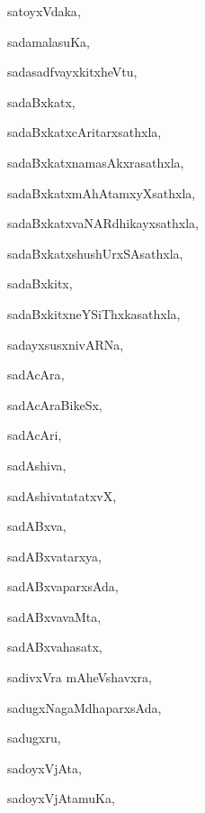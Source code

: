 \begin{multicols}{3}
{\noindent
{satoyxVdaka}, \pageref{satoyxVdaka}

\noindent
{sadamalasuKa}, \pageref{sadamalasuKa}

\noindent
{sadasadfvayxkitxheVtu}, \pageref{sadasadfvayxkitxheVtu}

\noindent
{sadaBxkatx}, \pageref{sadaBxkatx}

\noindent
{sadaBxkatxcAritarxsathxla}, \pageref{sadaBxkatxcAritarxsathxla}

\noindent
{sadaBxkatxnamasAkxrasathxla}, \pageref{sadaBxkatxnamasAkxrasathxla}

\noindent
{sadaBxkatxmAhAtamxyXsathxla}, \pageref{sadaBxkatxmAhAtamxyXsathxla}

\noindent
{sadaBxkatxvaNARdhikayxsathxla}, \pageref{sadaBxkatxvaNARdhikayxsathxla}

\noindent
{sadaBxkatxshushUrxSAsathxla}, \pageref{sadaBxkatxshushUrxSAsathxla}

\noindent
{sadaBxkitx}, \pageref{sadaBxkitx}

\noindent
{sadaBxkitxneYSiThxkasathxla}, \pageref{sadaBxkitxneYSiThxkasathxla}

\noindent
{sadayxsusxnivARNa}, \pageref{sadayxsusxnivARNa}

\noindent
{sadAcAra}, \pageref{sadAcAra}

\noindent
{sadAcAraBikeSx}, \pageref{sadAcAraBikeSx}

\noindent
{sadAcAri}, \pageref{sadAcAri}

\noindent
{sadAshiva}, \pageref{sadAshiva}

\noindent
{sadAshivatatatxvX}, \pageref{sadAshivatatatxvX}

\noindent
{sadABxva}, \pageref{sadABxva}

\noindent
{sadABxvatarxya}, \pageref{sadABxvatarxya}

\noindent
{sadABxvaparxsAda}, \pageref{sadABxvaparxsAda}

\noindent
{sadABxvavaMta}, \pageref{sadABxvavaMta}

\noindent
{sadABxvahasatx}, \pageref{sadABxvahasatx}

\noindent
{sadivxVra mAheVshavxra}, \pageref{sadivxVramAheVshavxra}

\noindent
{sadugxNagaMdhaparxsAda}, \pageref{sadugxNagaMdhaparxsAda}

\noindent
{sadugxru}, \pageref{sadugxru}

\noindent
{sadoyxVjAta}, \pageref{sadoyxVjAta}

\noindent
{sadoyxVjAtamuKa}, \pageref{sadoyxVjAtamuKa}

}
\end{multicols}
